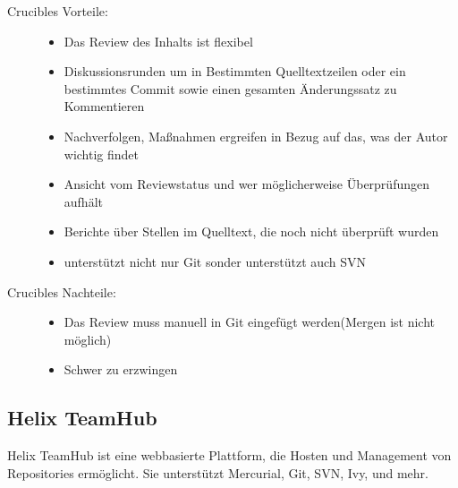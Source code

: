 \begin{description}
	\item [Crucibles Vorteile:] \hfill
	\begin{itemize}
		\item Das Review des Inhalts ist flexibel
		\item Diskussionsrunden um in Bestimmten Quelltextzeilen oder ein bestimmtes Commit sowie einen gesamten Änderungssatz zu Kommentieren
		\item Nachverfolgen, Maßnahmen ergreifen in Bezug auf das, was der Autor wichtig findet
		\item Ansicht vom Reviewstatus und wer möglicherweise Überprüfungen aufhält
		\item Berichte über Stellen im Quelltext, die noch nicht überprüft wurden
		\item unterstützt nicht nur Git sonder unterstützt auch \ac{SVN}
	\end{itemize}
	
	\item [Crucibles Nachteile:] \hfill
	\begin{itemize}
		\item Das Review muss manuell in Git eingefügt werden(Mergen ist nicht möglich)
		\item Schwer zu erzwingen
	\end{itemize}
\end{description}

\subsection{Helix TeamHub}
\label{subsec:HelixTeamHub}

Helix TeamHub ist eine webbasierte Plattform, die Hosten und Management von Repositories ermöglicht. Sie unterstützt Mercurial, Git, \ac{SVN}, Ivy, und mehr.

